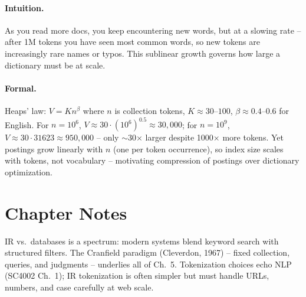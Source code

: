 \paragraph{Intuition.} As you read more docs, you keep encountering new words, but at a slowing rate -- after 1M tokens you have seen most common words, so new tokens are increasingly rare names or typos. This sublinear growth governs how large a dictionary must be at scale.

\paragraph{Formal.} Heaps' law: $V = K n^{\beta}$ where $n$ is collection tokens, $K\approx30$--$100$, $\beta\approx0.4$--$0.6$ for English. For $n=10^6$, $V\approx 30\cdot(10^6)^{0.5}\approx30{,}000$; for $n=10^9$, $V\approx 30\cdot31623\approx 950{,}000$ -- only $\sim$30$\times$ larger despite 1000$\times$ more tokens. Yet postings grow linearly with $n$ (one per token occurrence), so index size scales with tokens, not vocabulary -- motivating compression of postings over dictionary optimization.

\section{Chapter Notes}
IR vs.\ databases is a spectrum: modern systems blend keyword search with structured filters. The Cranfield paradigm (Cleverdon, 1967) -- fixed collection, queries, and judgments -- underlies all of Ch.~5. Tokenization choices echo NLP (SC4002 Ch.~1); IR tokenization is often simpler but must handle URLs, numbers, and case carefully at web scale.

